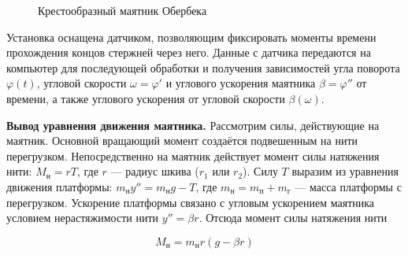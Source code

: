 \documentclass[14pt]{article}
\begin{document}
\begin{figure}[h!]
	\caption{Крестообразный маятник Обербека}
	\label{fig:image}
\end{figure}

Установка оснащена датчиком, позволяющим фиксировать моменты времени прохождения концов стержней через него. Данные с датчика передаются на компьютер для последующей обработки и получения зависимостей угла поворота $\varphi (t)$, угловой скорости $\omega = \varphi'$ и углового
ускорения маятника $\beta = \varphi''$ от времени, а также углового ускорения от угловой скорости $\beta(\omega)$.

\vspace{1cm}
\textbf{Вывод уравнения движения маятника.} Рассмотрим силы, действующие на маятник. Основной вращающий момент создаётся подвешенным на нити перегрузком. Непосредственно на маятник действует момент силы натяжения нити: $M_\text{н} = rT$, где $r$ --- радиус шкива ($r_1$ или $r_2$). Силу $T$ выразим из уравнения движения платформы: $m_\text{н}y'' = m_\text{н}g - T$, где $m_\text{н} = m_\text{п} + m_\text{г}$ --- масса платформы с перегрузком. Ускорение платформы связано с угловым ускорением маятника условием нерастяжимости нити $y'' = \beta r$. Отсюда момент силы натяжения нити

\begin{equation}
M_\text{н} = m_\text{н}r(g - \beta r)
\end{equation}
\end{document}
